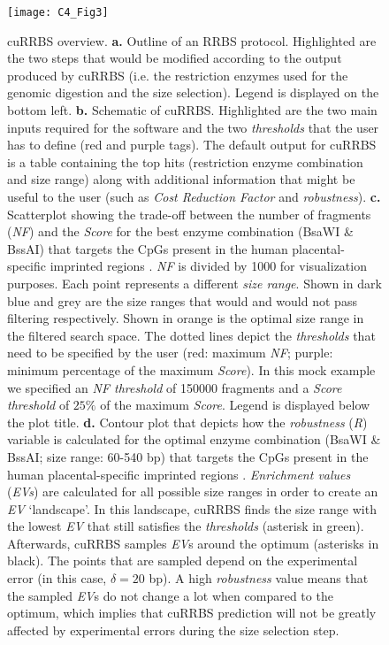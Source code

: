 \begin{figure}[htbp!] 
	\centering    
	\texttt{[image: C4\_Fig3]}
	\caption[cuRRBS overview]{cuRRBS overview. \textbf{a.} Outline of an RRBS protocol. Highlighted are the two steps that would be modified according to the output produced by cuRRBS (i.e. the restriction enzymes used for the genomic digestion and the size selection). Legend is displayed on the bottom left. \textbf{b.} Schematic of cuRRBS. Highlighted are the two main inputs required for the software and the two \textit{thresholds} that the user has to define (red and purple tags). The default output for cuRRBS is a table containing the top hits (restriction enzyme combination and size range) along with additional information that might be useful to the user (such as \textit{Cost Reduction Factor} and \textit{robustness}). \textbf{c.} Scatterplot showing the trade-off between the number of fragments (\textit{NF}) and the \textit{Score} for the best enzyme combination (BsaWI \& BssAI) that targets the CpGs present in the human placental-specific imprinted regions \citep{Hanna2016}. \textit{NF} is divided by 1000 for visualization purposes. Each point represents a different \textit{size range}. Shown in dark blue and grey are the size ranges that would and would not pass filtering respectively. Shown in orange is the optimal size range in the filtered search space. The dotted lines depict the \textit{thresholds} that need to be specified by the user (red: maximum \textit{NF}; purple: minimum percentage of the maximum \textit{Score}). In this mock example we specified an \textit{NF threshold} of 150000 fragments and a \textit{Score threshold} of $25\%$ of the maximum \textit{Score}. Legend is displayed below the plot title. \textbf{d.} Contour plot that depicts how the \textit{robustness} (\textit{R}) variable is calculated for the optimal enzyme combination (BsaWI \& BssAI; size range: 60-540 bp) that targets the CpGs present in the human placental-specific imprinted regions \citep{Hanna2016}. \textit{Enrichment values} (\textit{EVs}) are calculated for all possible size ranges in order to create an \textit{EV} `landscape'. In this landscape, cuRRBS finds the size range with the lowest \textit{EV} that still satisfies the \textit{thresholds} (asterisk in green). Afterwards, cuRRBS samples \textit{EV}s around the optimum (asterisks in black). The points that are sampled depend on the experimental error (in this case, $\delta = 20$ bp). A high \textit{robustness} value means that the sampled \textit{EV}s do not change a lot when compared to the optimum, which implies that cuRRBS prediction will not be greatly affected by experimental errors during the size selection step.}
	\label{fig:c4_fig3}
\end{figure}


